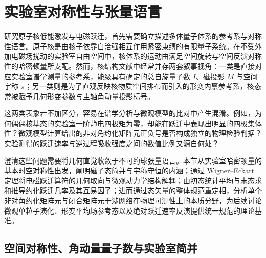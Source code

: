 \section{实验室对称性与张量语言}\label{sec:2-1}


研究原子核低能激发与电磁跃迁，首先需要确立描述多体量子体系的参考系与对称性语言。原子核是由核子依靠自洽强相互作用紧密束缚的有限量子系统。在不受外加电磁场扰动的实验室自由空间中，核体系的运动由满足空间旋转与空间反演对称性的哈密顿量所支配。然而，核结构文献中经常并存两套叙事视角：一类是直接对应实验室谱学测量的参考系，能级具有确定的总自旋量子数 $I$、磁投影 $M$ 与空间宇称 $\pi$；另一类则是为了直观反映核物质空间排布而引入的形变内禀参考系，核态常被赋予几何形变参数与主轴角动量投影标号。

这两类表象若不加区分，容易在谱学分析与微观模型的比对中产生混淆。例如，为何偶偶核基态的实验室一阶静电四极矩为零，却能在跃迁中表现出明显的四极集体性？微观模型计算给出的非对角约化矩阵元正负号是否构成独立的物理检验判据？实验测得的跃迁速率与逆过程吸收强度之间的数值比例又源自何处？

澄清这些问题需要将几何直觉收敛于不可约球张量语言。本节从实验室哈密顿量的基本时空对称性出发，阐明磁子态简并与宇称守恒的内涵；通过 Wigner–Eckart 定理将电磁跃迁算符的几何取向与微观动力学结构解耦；由初态统计平均与末态求和推导约化跃迁几率及其互易因子；进而通过态矢量的整体规范重定相，分析单个非对角约化矩阵元与闭合矩阵元干涉网络在物理可测性上的本质分野，为后续讨论微观单粒子演化、形变平均场参考态以及绝对跃迁速率反演提供统一规范的理论基准。



\subsection{空间对称性、角动量量子数与实验室简并}\label{sec:2-1-1}


